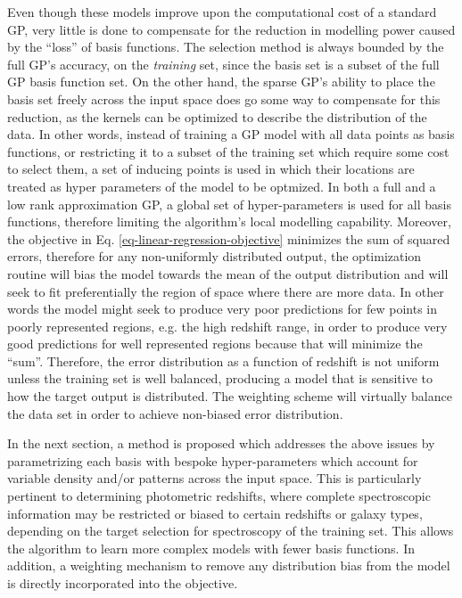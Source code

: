 \documentclass[useAMS,usenatbib,fleqn]{mn2e}
\begin{document}
Even though these models improve upon the computational cost of a standard GP, very little is done to compensate for the reduction in modelling power caused by the ``loss'' of basis functions. The selection method is always bounded by the full GP's accuracy, on the \emph{training} set, since the basis set is a subset of the full GP basis function set. On the other hand, the sparse GP's ability to place the basis set freely across the input space does go some way to compensate for this reduction, as the kernels can be optimized to describe the distribution of the data. In other words, instead of training a GP model with all data points as basis functions, or restricting it to a subset of the training set which require some cost to select them, a set of inducing points is used in which their locations are treated as hyper parameters of the model to be optmized. In both a full and a low rank approximation GP, a global set of hyper-parameters is used for all basis functions, therefore limiting the algorithm's local modelling capability. Moreover, the objective in Eq. \eqref{eq-linear-regression-objective} minimizes the sum of squared errors, therefore for any non-uniformly distributed output, the optimization routine will bias the model towards the mean of the output distribution and will seek to fit preferentially the region of space where there are more data. In other words the model might seek to produce very poor predictions for few points in poorly represented regions, e.g. the high redshift range, in order to produce very good predictions for well represented regions because that will minimize the ``sum''. Therefore, the error distribution as a function of redshift is not uniform unless the training set is well balanced, producing a model that is sensitive to how the target output is distributed. The weighting scheme will virtually balance the data set in order to achieve non-biased error distribution.

In the next section, a method is proposed which addresses the above issues by parametrizing each basis with bespoke hyper-parameters which account for variable density and/or patterns across the input space. This is particularly pertinent to determining photometric redshifts, where complete spectroscopic information may be restricted or biased to certain redshifts or galaxy types, depending on the target selection for spectroscopy of the training set.
This allows the algorithm to learn more complex models with fewer basis functions. In addition, a weighting mechanism to remove any distribution bias from the model is directly incorporated into the objective.
\end{document}
